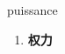 
\begin{frame}
{\huge puissance}
\begin{center}
\begin{enumerate}\Large
  \item \textbf{权力}
\end{enumerate}
\end{center}
\end{frame}
